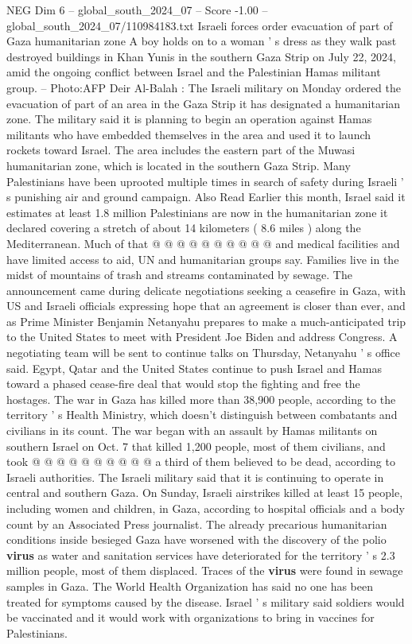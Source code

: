 \begin{textsample}{NEG Dim 6 – global\_south\_2024\_07 – Score -1.00 – global\_south\_2024\_07/110984183.txt}  \label{ex:f6_neg_121}
Israeli forces order evacuation of part of Gaza humanitarian zone A boy holds on to a woman ' s dress as they walk past destroyed buildings in Khan Yunis in the southern Gaza Strip on July 22, 2024, amid the ongoing conflict between Israel and the Palestinian Hamas militant group. -- Photo:AFP Deir Al-Balah : The Israeli military on Monday ordered the evacuation of part of an area in the Gaza Strip it has designated a humanitarian zone.
The military said it is planning to begin an operation against Hamas militants who have embedded themselves in the area and used it to launch rockets toward Israel.
The area includes the eastern part of the Muwasi humanitarian zone, which is located in the southern Gaza Strip.
Many Palestinians have been uprooted multiple times in search of safety during Israeli ' s punishing air and ground campaign.
Also Read Earlier this month, Israel said it estimates at least 1.8 million Palestinians are now in the humanitarian zone it declared covering a stretch of about 14 kilometers ( 8.6 miles ) along the Mediterranean.
Much of that @ @ @ @ @ @ @ @ @ @ and medical facilities and have limited access to aid, UN and humanitarian groups say.
Families live in the midst of mountains of trash and streams contaminated by sewage.
The announcement came during delicate negotiations seeking a ceasefire in Gaza, with US and Israeli officials expressing hope that an agreement is closer than ever, and as Prime Minister Benjamin Netanyahu prepares to make a much-anticipated trip to the United States to meet with President Joe Biden and address Congress.
A negotiating team will be sent to continue talks on Thursday, Netanyahu ' s office said.
Egypt, Qatar and the United States continue to push Israel and Hamas toward a phased cease-fire deal that would stop the fighting and free the hostages.
The war in Gaza has killed more than 38,900 people, according to the territory ' s Health Ministry, which doesn't distinguish between combatants and civilians in its count.
The war began with an assault by Hamas militants on southern Israel on Oct. 7 that killed 1,200 people, most of them civilians, and took @ @ @ @ @ @ @ @ @ @ a third of them believed to be dead, according to Israeli authorities.
The Israeli military said that it is continuing to operate in central and southern Gaza.
On Sunday, Israeli airstrikes killed at least 15 people, including women and children, in Gaza, according to hospital officials and a body count by an Associated Press journalist.
The already precarious humanitarian conditions inside besieged Gaza have worsened with the discovery of the polio \textbf{virus} as water and sanitation services have deteriorated for the territory ' s 2.3 million people, most of them displaced.
Traces of the \textbf{virus} were found in sewage samples in Gaza.
The World Health Organization has said no one has been treated for symptoms caused by the disease.
Israel ' s military said soldiers would be vaccinated and it would work with organizations to bring in vaccines for Palestinians.

\end{textsample}
